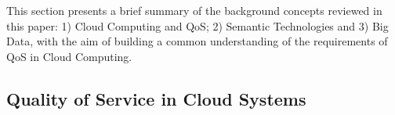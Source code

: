 This section presents a brief summary of the background concepts reviewed in this paper: 
1) Cloud Computing and QoS; 2) Semantic Technologies and 3) Big Data, with the 
aim of building a common understanding of the requirements of QoS in Cloud Computing.


\subsection{Quality of Service in Cloud Systems}

